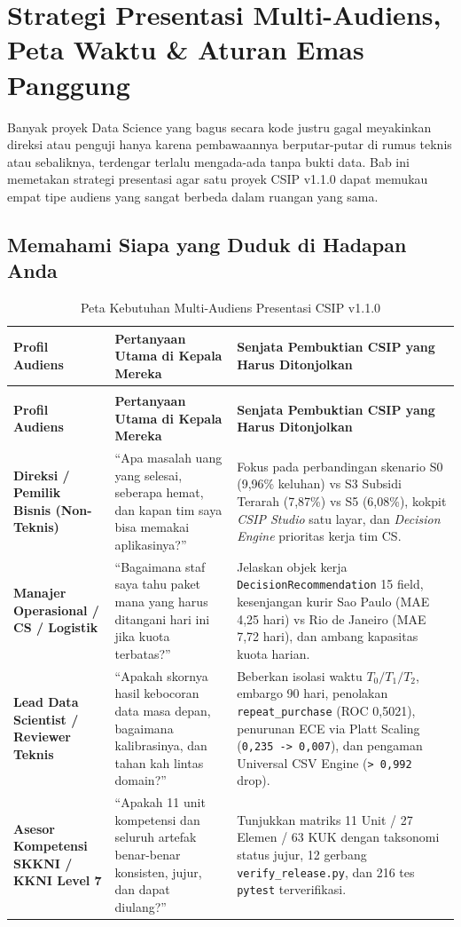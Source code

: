 \documentclass[11pt,a4paper,oneside]{book}
\newcommand{\code}[1]{{\small\nolinkurl{#1}}}
\begin{document}
\chapter{Strategi Presentasi Multi-Audiens, Peta Waktu \& Aturan Emas Panggung}

Banyak proyek Data Science yang bagus secara kode justru gagal meyakinkan direksi atau penguji hanya karena pembawaannya berputar-putar di rumus teknis atau sebaliknya, terdengar terlalu mengada-ada tanpa bukti data. Bab ini memetakan strategi presentasi agar satu proyek CSIP v1.1.0 dapat memukau empat tipe audiens yang sangat berbeda dalam ruangan yang sama.

\section{Memahami Siapa yang Duduk di Hadapan Anda}

\begin{longtable}{@{} >{\raggedright\arraybackslash}p{3.3cm} >{\raggedright\arraybackslash}p{4.7cm} >{\raggedright\arraybackslash}p{7.4cm} @{}}
\caption{Peta Kebutuhan Multi-Audiens Presentasi CSIP v1.1.0} \\
\toprule
\textbf{Profil Audiens} & \textbf{Pertanyaan Utama di Kepala Mereka} & \textbf{Senjata Pembuktian CSIP yang Harus Ditonjolkan} \\
\midrule
\endfirsthead
\multicolumn{1}{@{}l}{\small\emph{(Tabel lanjutan)}} \\
\toprule
\textbf{Profil Audiens} & \textbf{Pertanyaan Utama di Kepala Mereka} & \textbf{Senjata Pembuktian CSIP yang Harus Ditonjolkan} \\
\midrule
\endhead
\bottomrule
\endfoot
\textbf{Direksi / Pemilik Bisnis (Non-Teknis)} & ``Apa masalah uang yang selesai, seberapa hemat, dan kapan tim saya bisa memakai aplikasinya?'' & Fokus pada perbandingan skenario S0 (9,96\% keluhan) vs S3 Subsidi Terarah (7,87\%) vs S5 (6,08\%), kokpit \emph{CSIP Studio} satu layar, dan \emph{Decision Engine} prioritas kerja tim CS. \\
\textbf{Manajer Operasional / CS / Logistik} & ``Bagaimana staf saya tahu paket mana yang harus ditangani hari ini jika kuota terbatas?'' & Jelaskan objek kerja \code{DecisionRecommendation} 15 field, kesenjangan kurir Sao Paulo (MAE 4,25 hari) vs Rio de Janeiro (MAE 7,72 hari), dan ambang kapasitas kuota harian. \\
\textbf{Lead Data Scientist / Reviewer Teknis} & ``Apakah skornya hasil kebocoran data masa depan, bagaimana kalibrasinya, dan tahan kah lintas domain?'' & Beberkan isolasi waktu $T_0/T_1/T_2$, embargo 90 hari, penolakan \code{repeat_purchase} (ROC 0,5021), penurunan ECE via Platt Scaling (\code{0,235 -> 0,007}), dan pengaman Universal CSV Engine (\code{> 0,992} drop). \\
\textbf{Asesor Kompetensi SKKNI / KKNI Level 7} & ``Apakah 11 unit kompetensi dan seluruh artefak benar-benar konsisten, jujur, dan dapat diulang?'' & Tunjukkan matriks 11 Unit / 27 Elemen / 63 KUK dengan taksonomi status jujur, 12 gerbang \code{verify_release.py}, dan 216 tes \code{pytest} terverifikasi. \\
\end{longtable}
\end{document}
